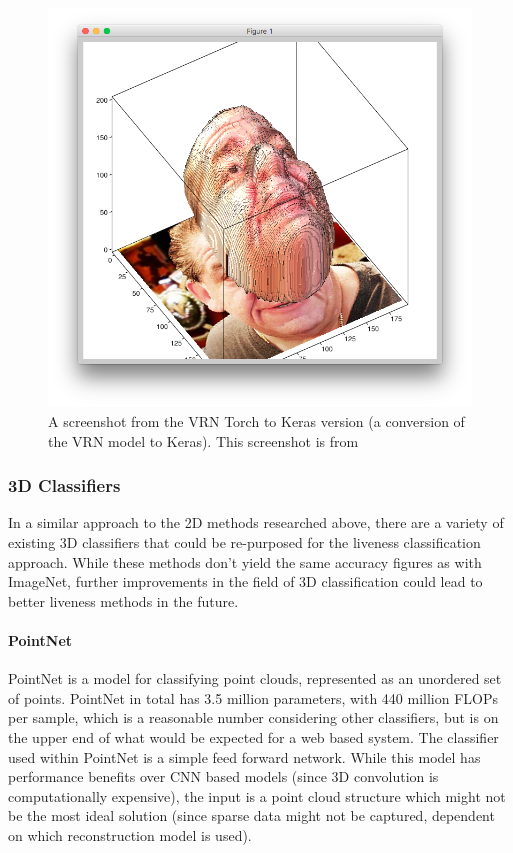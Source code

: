 \documentclass[10pt,a4paper]{article}
\begin{document}
            \begin{figure}
                \centering
                \includegraphics[width=.5\linewidth]{3DReconstructionFromSource}
                \caption{A screenshot from the VRN Torch to Keras version (a conversion of the VRN model to Keras). This screenshot is from \cite{VRNTorchToKeras}}
                \label{3DReconstructionScreenshot}
            \end{figure}


        \subsubsection{3D Classifiers}
            In a similar approach to the 2D methods researched above, there are a variety of existing 3D classifiers that could be re-purposed for the liveness classification approach.
            While these methods don't yield the same accuracy figures as with ImageNet, further improvements in the field of 3D classification could lead to better liveness methods in the future.

            \paragraph{PointNet}
                PointNet is a model for classifying point clouds, represented as an unordered set of points. PointNet in total has 3.5 million parameters, with 440 million FLOPs per sample, which 
                is a reasonable number considering other classifiers, but is on the upper end of what would be expected for a web based system. The classifier used within PointNet is a simple feed forward network.
                \cite{PointNet}
                While this model has performance benefits over CNN based models (since 3D convolution is computationally expensive),
                the input is a point cloud structure which might not be the most ideal solution (since sparse data might not be captured, dependent on which reconstruction model is used).
                
\end{document}
